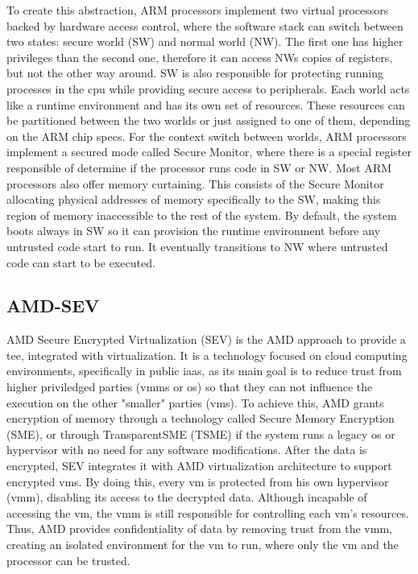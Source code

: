 To create this abstraction, ARM processors implement two virtual processors backed by hardware access control, where the software stack can switch between two states: secure world (SW) and normal world (NW). 
The first one has higher privileges than the second one, therefore it can access NWs copies of registers, but not the other way around. SW is also responsible for protecting running processes in the \gls{cpu} while providing secure access to peripherals. 
Each world acts like a runtime environment and has its own set of resources. These resources can be partitioned between the two worlds or just assigned to one of them, depending on the ARM chip specs.
For the context switch between worlds, ARM processors implement a secured mode called Secure Monitor, where there is a special register responsible of determine if the processor runs code in SW or NW. 
Most ARM processors also offer memory curtaining. This consists of the Secure Monitor allocating physical addresses of memory specifically to the SW, making this region of memory inaccessible to the rest of the system.
By default, the system boots always in SW so it can provision the runtime environment before any untrusted code start to run. It eventually transitions to NW where untrusted code can start to be executed. 

\subsection{AMD-SEV}
\label{ssec:amdsev}
AMD Secure Encrypted Virtualization (SEV) \cite{amdPaper} is the AMD approach to provide a \gls{tee}, integrated with virtualization. It is a technology focused on cloud computing environments, specifically in public \gls{iaas}, as its main goal is to reduce trust from higher priviledged parties (\gls{vmm}s or \gls{os}) so that they can not influence the execution on the other "smaller" parties (\gls{vm}s). 
To achieve this, AMD grants encryption of memory through a technology called Secure Memory Encryption (SME), or through TransparentSME (TSME) if the system runs a legacy \gls{os} or hypervisor with no need for any software modifications.
After the data is encrypted, SEV integrates it with AMD virtualization architecture to support encrypted \gls{vm}s. By doing this, every \gls{vm} is protected from his own hypervisor (\gls{vmm}), disabling its access to the decrypted data. Although incapable of accessing the \gls{vm}, the \gls{vmm} is still responsible for controlling each \gls{vm}'s resources. 
Thus, AMD provides confidentiality of data by removing trust from the \gls{vmm}, creating an isolated environment for the \gls{vm} to run, where only the \gls{vm} and the processor can be trusted. 

